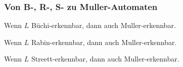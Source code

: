     \begin{frame}[t]
      \frametitle{Von B-, R-, S- zu Muller-Automaten}
      
      \begin{lemma}
        \begin{Enumerate}
          \item
            Wenn $L$ Büchi-erkennbar, dann auch Muller-erkennbar.
          \item
            Wenn $L$ Rabin-erkennbar, dann auch Muller-erkennbar.
          \item
            Wenn $L$ Streett-erkennbar, dann auch Muller-erkennbar.
        \end{Enumerate}%
        \label{lem:BRStoM}%
      \end{lemma}
    
      \parII
      
    \end{frame}

